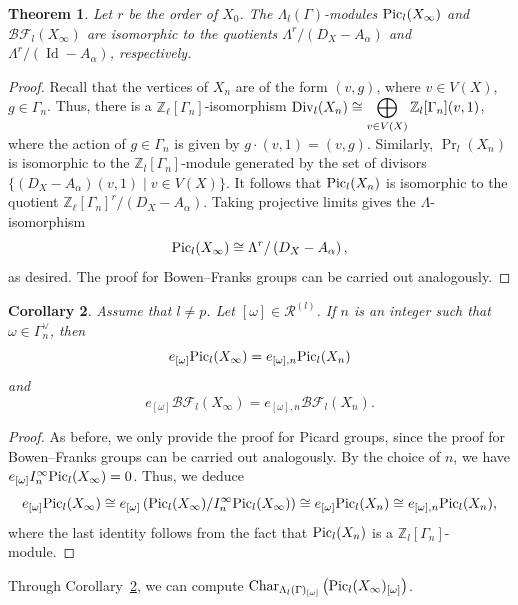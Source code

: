\documentclass[11pt]{amsart}
\DeclareMathOperator{\Id}{Id}
\newtheorem{theorem}{Theorem}[section]
\newtheorem{corollary}[theorem]{Corollary}
\numberwithin{equation}{section}
\theoremstyle{remark}
\newcommand{\?}{\stackrel{?}{=}}
\newcommand{\ZZ}{\mathbb{Z}}
\newcommand{\Z}{\mathbb{Z}}
\newcommand{\Char}{\mathrm{Char}}
\newcommand{\Div}{\textup{Div}}
\newcommand{\Pic}{\textup{Pic}}
\newcommand{\BF}{\mathcal{BF}}
\newcommand{\sR}{\mathscr{R}}
\newcommand{\Zl}{\ZZ_\ell}
\newcommand{\pic}{\textup{Pic}}
\begin{document}
\begin{theorem}
\label{char-udir}
Let $r$ be the order of $X_0$. The $\Lambda_l(\Gamma)$-modules ${\rm Pic}_{l}(X_{\infty})$ and $\BF_l(X_\infty)$ are isomorphic to the quotients $\Lambda^r/\left(D_X-A_\alpha\right)$ and $\Lambda^r/\left(\Id-A_\alpha\right)$, respectively.
\end{theorem}
\begin{proof}
 Recall that the vertices of $X_n$ are of the form $(v,g)$, where $v\in V(X)$, $g\in \Gamma_n$. Thus, there is a $\Zl[\Gamma_n]$-isomorphism $\Div_l(X_n)\cong \displaystyle\bigoplus_{v\in V(X)}\Z_l[\Gamma_n](v,1)$, where the action of $g\in\Gamma_n$ is given by $g\cdot(v,1)=(v,g)$. Similarly, $\Pr_l(X_n)$ is isomorphic to the $\Z_l[\Gamma_n]$-module generated by the set of divisors $\{(D_X-A_\alpha)(v,1)\mid v\in V(X)\}$. It follows that $\pic_l(X_n)$ is isomorphic to the quotient $\Zl[\Gamma_n]^r/\left(D_X-A_\alpha\right)$. Taking projective limits gives the $\Lambda$-isomorphism
    \[
    \Pic_l(X_\infty)\cong \Lambda^r/\left(D_X-A_\alpha\right),
    \]
    as desired. The proof for Bowen--Franks groups can be carried out analogously.
\end{proof}






\begin{corollary}
\label{projection-fin-level} Assume that $l\neq p$.
   Let $[\omega]\in \sR^{(l)}$. If $n$ is an integer such that $\omega\in \Gamma_n^\vee$, then  
    \[e_{[\omega]} \pic_l(X_\infty)=e_{[\omega],n}\pic_l(X_n)\]
    and
    \[e_{[\omega]} \BF_l(X_\infty)=e_{[\omega],n}\BF_l(X_n).\] 
\end{corollary}
\begin{proof}
As before, we only provide the proof for Picard groups, since the proof for Bowen--Franks groups can be carried out analogously.    By the choice of $n$, we have $e_{[\omega]}I_n^\infty\pic_l(X_\infty)=0$. Thus, we deduce
    \[e_{[\omega]}\pic_l(X_\infty)\cong e_{[\omega]}\left(\pic_l(X_\infty)/I^\infty_n\pic_l(X_\infty)\right)\cong e_{[\omega]}\pic_l(X_n)\cong e_{[\omega],n}\pic_l(X_n),\]
    where the last identity follows from the fact that $\pic_l(X_n)$ is a $\Z_l[\Gamma_n]$-module. 
\end{proof}

Through Corollary~\ref{projection-fin-level}, we can compute $\Char_{\Lambda_l(\Gamma)_{[\omega]}}\left(\pic_l(X_\infty)_{[\omega]}\right)$. 
\end{document}
